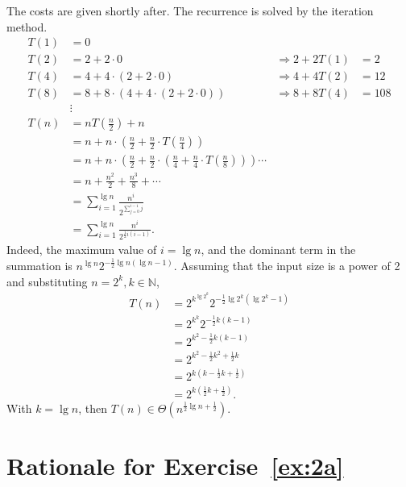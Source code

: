 \documentclass[12pt]{article}
\begin{document}
\begin{enumerate}
\begin{enumerate}
    The costs are given shortly after. The recurrence is solved by the iteration method. 
    \begin{align*}
      T(1) &= 0 \\
      T(2) &= 2 + 2 \cdot 0 &\Rightarrow 2 + 2T(1) &= 2 \\
      T(4) &= 4 + 4 \cdot (2 + 2 \cdot 0) &\Rightarrow 4 + 4T(2) &= 12 \\
      T(8) &= 8 + 8 \cdot (4 + 4 \cdot (2 + 2 \cdot 0)) &\Rightarrow 8 + 8T(4) &= 108 \\
      &\vdots \\
      T(n) &= nT(\tfrac{n}{2}) + n \\
      &= n + n \cdot (\tfrac{n}{2} + \tfrac{n}{2} \cdot T(\tfrac{n}{4})) \\
      &= n + n \cdot (\tfrac{n}{2} + \tfrac{n}{2} \cdot (\tfrac{n}{4} + \tfrac{n}{4} \cdot T(\tfrac{n}{8}))) \cdots \\
      &= n + \tfrac{n^{2}}{2} + \tfrac{n^{3}}{8} + \cdots \\
      &= \sum_{i = 1}^{\lg n} \frac{n^{i}}{2^{\sum_{j = 0}^{i - 1} j}} \\
      &= \sum_{i = 1}^{\lg n} \frac{n^{i}}{2^{\frac{1}{2}i (i - 1)}}.
    \end{align*}
    Indeed, the maximum value of $i = \lg n$, and the dominant term in the summation is $n^{\lg n} 2^{-\frac{1}{2}\lg n(\lg n - 1)}$. Assuming that the input size is a power of 2 and substituting $n = 2^{k}, k \in \mathbb{N}$,
    \begin{align*}
      T(n) &= 2^{k^{\lg 2^{k}}}2^{-\frac{1}{2}\lg 2^{k}(\lg 2^{k} - 1)} \\
      &= 2^{k^{k}}2^{-\frac{1}{2}k(k - 1)} \\
      &= 2^{k^{2} - \frac{1}{2}k(k - 1)} \\
      &= 2^{k^{2} - \frac{1}{2}k^{2} + \frac{1}{2}k} \\
      &= 2^{k(k - \frac{1}{2}k + \frac{1}{2})} \\
      &= 2^{k(\frac{1}{2}k + \frac{1}{2})}.
    \end{align*}
    With $k = \lg n$, then $T(n) \in \Theta(n^{\frac{1}{2}\lg n + \frac{1}{2}})$.
  \end{enumerate}
\end{enumerate}

\appendix

\section{Rationale for Exercise~\ref{ex:2a}}\label{appendix:2a}
\end{document}
